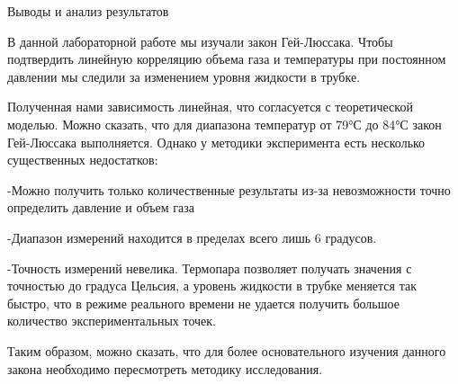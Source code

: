 \documentclass[12pt]{article}
\begin{document}
    \begin{point}{Выводы и анализ результатов}
        \par В данной лабораторной работе мы изучали закон Гей-Люссака. Чтобы подтвердить линейную корреляцию объема газа и температуры при постоянном давлении мы следили за изменением уровня жидкости в трубке.
        \par Полученная нами зависимость линейная, что согласуется с теоретической моделью. Можно сказать, что для диапазона температур от 79°С до 84°С закон Гей-Люссака выполняется. Однако у методики эксперимента есть несколько существенных недостатков:
        \par -Можно получить только количественные результаты из-за невозможности точно определить давление и объем газа
        \par -Диапазон измерений находится в пределах всего лишь 6 градусов.
        \par -Точность измерений невелика. Термопара позволяет получать значения с точностью до градуса Цельсия, а уровень жидкости в трубке меняется так быстро, что в режиме реального времени не удается получить большое количество экспериментальных точек.
        \par Таким образом, можно сказать, что для более основательного изучения данного закона необходимо пересмотреть методику исследования.
    \end{point}
\end{document}
